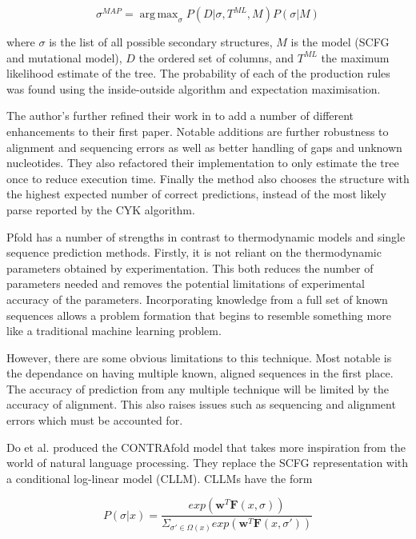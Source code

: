 \documentclass[journal]{IEEEtran}
\DeclareMathOperator*{\argmax}{arg\,max}
\begin{document}
\begin{equation}
	\sigma^{MAP} = \argmax_{\sigma} P(D | \sigma, T^{ML}, M)P(\sigma | M)
\end{equation}

where $\sigma$ is the list of all possible secondary structures, $M$ is the model (SCFG and mutational model), $D$ the ordered set of columns, and $T^{ML}$ the maximum likelihood estimate of the tree. The probability of each of the production rules was found using the inside-outside algorithm and expectation maximisation.

The author's further refined their work in \cite{knudsen2003pfold} to add a number of different enhancements to their first paper. Notable additions are further robustness to alignment and sequencing errors as well as better handling of gaps and unknown nucleotides. They also refactored their implementation to only estimate the tree once to reduce execution time. Finally the method also chooses the structure with the highest expected number of correct predictions, instead of the most likely parse reported by the CYK algorithm.

Pfold has a number of strengths in contrast to thermodynamic models and single sequence prediction methods. Firstly, it is not reliant on the thermodynamic parameters obtained by experimentation. This both reduces the number of parameters needed and removes the potential limitations of experimental accuracy of the parameters. Incorporating knowledge from a full set of known sequences allows a problem formation that begins to resemble something more like a traditional machine learning problem.

However, there are some obvious limitations to this technique. Most notable is the dependance on having multiple known, aligned sequences in the first place. The accuracy of prediction from any multiple technique will be limited by the accuracy of alignment. This also raises issues such as sequencing and alignment errors which must be accounted for.

Do et al. \cite{do2006contrafold} produced the CONTRAfold model that takes more inspiration from the world of natural language processing. They replace the SCFG representation with a conditional log-linear model (CLLM). CLLMs have the form

\begin{equation}
	\label{eq:cllm}
	P(\sigma|x) = \frac{exp(\mathbf{w}^T \mathbf{F}(x, \sigma))}{\Sigma_{\sigma'\in \Omega(x)} exp(\mathbf{w}^T \mathbf{F}(x, \sigma'))} 
\end{equation}
\end{document}
